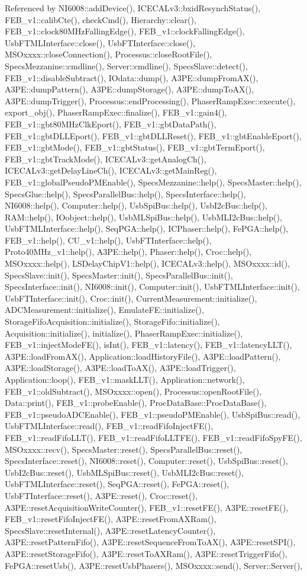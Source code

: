 Referenced by NI6008::addDevice(), ICECALv3::bxidResynchStatus(), FEB\_\-v1::calibCte(), checkCmd(), Hierarchy::clear(), FEB\_\-v1::clock80MHzFallingEdge(), FEB\_\-v1::clockFallingEdge(), UsbFTMLInterface::close(), UsbFTInterface::close(), MSOxxxx::closeConnection(), Processus::closeRootFile(), SpecsMezzanine::cmdline(), Server::cmdline(), SpecsSlave::detect(), FEB\_\-v1::disableSubtract(), IOdata::dump(), A3PE::dumpFromAX(), A3PE::dumpPattern(), A3PE::dumpStorage(), A3PE::dumpToAX(), A3PE::dumpTrigger(), Processus::endProcessing(), PhaserRampExec::execute(), export\_\-obj(), PhaserRampExec::finalize(), FEB\_\-v1::gain4(), FEB\_\-v1::gbt80MHzClkEport(), FEB\_\-v1::gbtDataPath(), FEB\_\-v1::gbtDLLEport(), FEB\_\-v1::gbtDLLReset(), FEB\_\-v1::gbtEnableEport(), FEB\_\-v1::gbtMode(), FEB\_\-v1::gbtStatus(), FEB\_\-v1::gbtTermEport(), FEB\_\-v1::gbtTrackMode(), ICECALv3::getAnalogCh(), ICECALv3::getDelayLineCh(), ICECALv3::getMainReg(), FEB\_\-v1::globalPseudoPMEnable(), SpecsMezzanine::help(), SpecsMaster::help(), SpecsGlue::help(), SpecsParallelBus::help(), SpecsInterface::help(), NI6008::help(), Computer::help(), UsbSpiBus::help(), UsbI2cBus::help(), RAM::help(), IOobject::help(), UsbMLSpiBus::help(), UsbMLI2cBus::help(), UsbFTMLInterface::help(), SeqPGA::help(), ICPhaser::help(), FePGA::help(), FEB\_\-v1::help(), CU\_\-v1::help(), UsbFTInterface::help(), Proto40MHz\_\-v1::help(), A3PE::help(), Phaser::help(), Croc::help(), MSOxxxx::help(), LSDelayChipV1::help(), ICECALv3::help(), MSOxxxx::id(), SpecsSlave::init(), SpecsMaster::init(), SpecsParallelBus::init(), SpecsInterface::init(), NI6008::init(), Computer::init(), UsbFTMLInterface::init(), UsbFTInterface::init(), Croc::init(), CurrentMeasurement::initialize(), ADCMeasurement::initialize(), EmulateFE::initialize(), StorageFifoAcquisition::initialize(), StorageFifo::initialize(), Acquisition::initialize(), initialize(), PhaserRampExec::initialize(), FEB\_\-v1::injectModeFE(), isInt(), FEB\_\-v1::latency(), FEB\_\-v1::latencyLLT(), A3PE::loadFromAX(), Application::loadHistoryFile(), A3PE::loadPattern(), A3PE::loadStorage(), A3PE::loadToAX(), A3PE::loadTrigger(), Application::loop(), FEB\_\-v1::maskLLT(), Application::network(), FEB\_\-v1::oldSubtract(), MSOxxxx::open(), Processus::openRootFile(), Data::print(), FEB\_\-v1::probeEnable(), ProcDataBase::ProcDataBase(), FEB\_\-v1::pseudoADCEnable(), FEB\_\-v1::pseudoPMEnable(), UsbSpiBus::read(), UsbFTMLInterface::read(), FEB\_\-v1::readFifoInjectFE(), FEB\_\-v1::readFifoLLT(), FEB\_\-v1::readFifoLLTFE(), FEB\_\-v1::readFifoSpyFE(), MSOxxxx::recv(), SpecsMaster::reset(), SpecsParallelBus::reset(), SpecsInterface::reset(), NI6008::reset(), Computer::reset(), UsbSpiBus::reset(), UsbI2cBus::reset(), UsbMLSpiBus::reset(), UsbMLI2cBus::reset(), UsbFTMLInterface::reset(), SeqPGA::reset(), FePGA::reset(), UsbFTInterface::reset(), A3PE::reset(), Croc::reset(), A3PE::resetAcquisitionWriteCounter(), FEB\_\-v1::resetFE(), A3PE::resetFE(), FEB\_\-v1::resetFifoInjectFE(), A3PE::resetFromAXRam(), SpecsSlave::resetInternal(), A3PE::resetLatencyCounter(), A3PE::resetPatternFifo(), A3PE::resetSequenceFromToAX(), A3PE::resetSPI(), A3PE::resetStorageFifo(), A3PE::resetToAXRam(), A3PE::resetTriggerFifo(), FePGA::resetUsb(), A3PE::resetUsbPhasers(), MSOxxxx::send(), Server::Server(), 